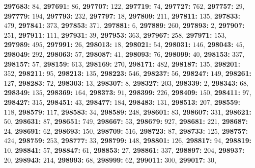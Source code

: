 \textsf{\bfseries 297683:} $84$, \textsf{\bfseries 297691:} $86$, \textsf{\bfseries 297707:} $122$, \textsf{\bfseries 297719:} $74$, \textsf{\bfseries 297727:} $762$, \textsf{\bfseries 297757:} $29$, \textsf{\bfseries 297779:} $194$, \textsf{\bfseries 297793:} $232$, \textsf{\bfseries 297797:} $18$, \textsf{\bfseries 297809:} $211$, \textsf{\bfseries 297811:} $135$, \textsf{\bfseries 297833:} $479$, \textsf{\bfseries 297841:} $373$, \textsf{\bfseries 297853:} $371$, \textsf{\bfseries 297881:} $6$, \textsf{\bfseries 297889:} $260$, \textsf{\bfseries 297893:} $2$, \textsf{\bfseries 297907:} $251$, \textsf{\bfseries 297911:} $111$, \textsf{\bfseries 297931:} $39$, \textsf{\bfseries 297953:} $363$, \textsf{\bfseries 297967:} $258$, \textsf{\bfseries 297971:} $153$, \textsf{\bfseries 297989:} $495$, \textsf{\bfseries 297991:} $26$, \textsf{\bfseries 298013:} $18$, \textsf{\bfseries 298021:} $54$, \textsf{\bfseries 298031:} $146$, \textsf{\bfseries 298043:} $45$, \textsf{\bfseries 298049:} $292$, \textsf{\bfseries 298063:} $57$, \textsf{\bfseries 298087:} $41$, \textsf{\bfseries 298093:} $76$, \textsf{\bfseries 298099:} $40$, \textsf{\bfseries 298153:} $337$, \textsf{\bfseries 298157:} $57$, \textsf{\bfseries 298159:} $613$, \textsf{\bfseries 298169:} $270$, \textsf{\bfseries 298171:} $482$, \textsf{\bfseries 298187:} $135$, \textsf{\bfseries 298201:} $352$, \textsf{\bfseries 298211:} $95$, \textsf{\bfseries 298213:} $135$, \textsf{\bfseries 298223:} $546$, \textsf{\bfseries 298237:} $56$, \textsf{\bfseries 298247:} $149$, \textsf{\bfseries 298261:} $127$, \textsf{\bfseries 298283:} $72$, \textsf{\bfseries 298303:} $13$, \textsf{\bfseries 298307:} $8$, \textsf{\bfseries 298327:} $203$, \textsf{\bfseries 298339:} $2$, \textsf{\bfseries 298343:} $68$, \textsf{\bfseries 298349:} $135$, \textsf{\bfseries 298369:} $164$, \textsf{\bfseries 298373:} $91$, \textsf{\bfseries 298399:} $226$, \textsf{\bfseries 298409:} $150$, \textsf{\bfseries 298411:} $97$, \textsf{\bfseries 298427:} $315$, \textsf{\bfseries 298451:} $43$, \textsf{\bfseries 298477:} $184$, \textsf{\bfseries 298483:} $131$, \textsf{\bfseries 298513:} $207$, \textsf{\bfseries 298559:} $118$, \textsf{\bfseries 298579:} $117$, \textsf{\bfseries 298583:} $34$, \textsf{\bfseries 298589:} $248$, \textsf{\bfseries 298601:} $83$, \textsf{\bfseries 298607:} $331$, \textsf{\bfseries 298621:} $50$, \textsf{\bfseries 298631:} $87$, \textsf{\bfseries 298651:} $749$, \textsf{\bfseries 298667:} $53$, \textsf{\bfseries 298679:} $927$, \textsf{\bfseries 298681:} $221$, \textsf{\bfseries 298687:} $24$, \textsf{\bfseries 298691:} $62$, \textsf{\bfseries 298693:} $150$, \textsf{\bfseries 298709:} $516$, \textsf{\bfseries 298723:} $87$, \textsf{\bfseries 298733:} $125$, \textsf{\bfseries 298757:} $424$, \textsf{\bfseries 298759:} $253$, \textsf{\bfseries 298777:} $33$, \textsf{\bfseries 298799:} $148$, \textsf{\bfseries 298801:} $126$, \textsf{\bfseries 298817:} $94$, \textsf{\bfseries 298819:} $10$, \textsf{\bfseries 298841:} $57$, \textsf{\bfseries 298847:} $61$, \textsf{\bfseries 298853:} $27$, \textsf{\bfseries 298861:} $337$, \textsf{\bfseries 298897:} $204$, \textsf{\bfseries 298937:} $20$, \textsf{\bfseries 298943:} $214$, \textsf{\bfseries 298993:} $68$, \textsf{\bfseries 298999:} $62$, \textsf{\bfseries 299011:} $300$, \textsf{\bfseries 299017:} $30$, 
